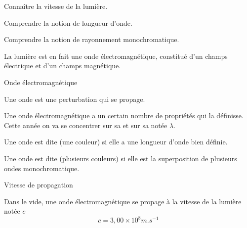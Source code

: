 \sndEnTeteQuatre

\vspace*{-32pt}


\begin{objectifs}
  \item Connaître la vitesse de la lumière.
  \item Comprendre la notion de longueur d'onde.
  \item Comprendre la notion de rayonnement monochromatique.
\end{objectifs}

\begin{contexte}
  La lumière est en fait une onde électromagnétique, constitué d'un champs électrique et d'un champs magnétique.
  
\end{contexte}


\begin{doc}{Onde électromagnétique}
  \vspace*{-24pt}
  \begin{encart}
    Une onde est une perturbation qui se propage.
  \end{encart}
  
  Une onde électromagnétique a un certain nombre de propriétés qui la définisse.
  Cette année on va se concentrer sur sa  et sur sa  notée $\lambda$.
  
  \begin{encart}
    Une onde est dite  (une couleur) si elle a une longueur d'onde bien définie.
    
    Une onde est dite  (plusieurs couleurs) si elle est la superposition de plusieurs ondes monochromatique.
  \end{encart}
\end{doc}

\begin{doc}{Vitesse de propagation}
  \vspace*{-24pt}
  \begin{encart}
    Dans le vide, une onde électromagnétique se propage à la vitesse de la lumière notée $c$
    \begin{equation*}
      c = 3,\!00 \times 10^8 \unit{m.s}^{-1}
    \end{equation*}
  \end{encart}
\end{doc}

